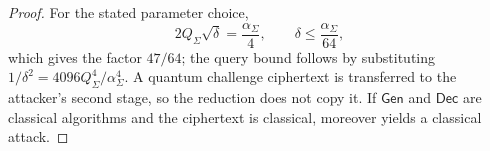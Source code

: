 \documentclass[11pt]{article}
\newcounter{algorithm}
\newcommand{\Gen}{\mathsf{Gen}}
\newcommand{\Dec}{\mathsf{Dec}}
\begin{document}
\begin{proof}
For the stated parameter choice,
\[
  2Q_\Sigma\sqrt\delta=\frac{\alpha_\Sigma}{4},
  \qquad
  \delta\le\frac{\alpha_\Sigma}{64},
\]
which gives the factor \(47/64\); the query bound follows by substituting
\(1/\delta^2=4096Q_\Sigma^4/\alpha_\Sigma^4\).  A quantum challenge
ciphertext is transferred to the attacker's second stage, so the reduction
does not copy it.  If \(\Gen\) and \(\Dec\) are classical algorithms and the
ciphertext is classical,  moreover yields a classical
attack.
\end{proof}



\end{document}
